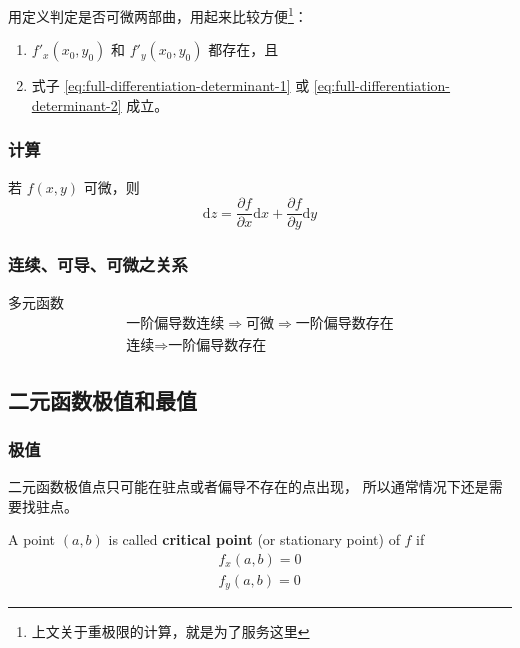 用定义判定是否可微两部曲，用起来比较方便\footnote{上文关于重极限的计算，就是为了服务这里}：
\begin{enumerate}
    \item $f'_x(x_0, y_0)$ 和 $f'_y(x_0, y_0)$ 都存在，且
    \item 式子 \ref{eq:full-differentiation-determinant-1} 或 \ref{eq:full-differentiation-determinant-2} 成立。
\end{enumerate}

\subsubsection{计算}

若 $f(x,y)$ 可微，则
\[
    \mathrm{d}z = \dfrac{\partial f}{\partial x} \mathrm{d}x + \dfrac{\partial f}{\partial y} \mathrm{d}y
\]

\subsubsection{连续、可导、可微之关系}
\label{relationship-among-continuous-differentiable}

多元函数
\begin{gather*}
    \mbox{一阶偏导数连续} \Rightarrow \mbox{可微} \Rightarrow \mbox{一阶偏导数存在} \\
    \mbox{连续} \Rightarrow \mbox{一阶偏导数存在}
\end{gather*}

\subsection{二元函数极值和最值}

\subsubsection{极值}

二元函数极值点只可能在驻点或者偏导不存在的点出现，
所以通常情况下还是需要找驻点。

\begin{definition}
    \label{def:critical_point_multivariable}
    A point $(a, b)$ is called \textbf{critical point} (or stationary point)
    of $f$ if
    \begin{gather*}
        f_x(a, b) = 0\\
        f_y(a, b) = 0
    \end{gather*}
\end{definition}

